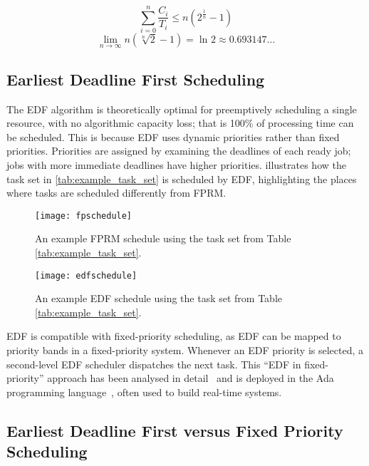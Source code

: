 \begin{equation}
    \label{eq:3}
    \sum\limits_{i=0}^n \dfrac{C_{i}}{T_{i}} \leq n(2^{\frac{1}{n}}-1)
\end{equation}
\begin{equation}
    \label{eq:4}
    \lim_{n \to \infty}n(\sqrt[n]{2}-1) = \ln_{} 2 \approx 0.693147\ldots
\end{equation}

\subsection{Earliest Deadline First Scheduling}
\label{sec:background-edf}

The \gls{EDF} algorithm is theoretically optimal for preemptively scheduling a single resource, with no
algorithmic capacity loss; that is 100\% of processing time can be scheduled. This is because
\gls{EDF} uses dynamic priorities rather than fixed priorities. 
Priorities are assigned by examining the deadlines of each ready job; jobs with more immediate deadlines have higher priorities.
 illustrates how the task set in \cref{tab:example_task_set} is scheduled by
\gls{EDF}, highlighting the places where tasks are scheduled differently from FPRM.

\begin{figure}[t]
	\centering
    \texttt{[image: fpschedule]}
    \caption[An example FPRM schedule.]{An example FPRM schedule using the task set from Table \ref{tab:example_task_set}.}
    \label{f:fp-schedule}
\end{figure}
\begin{figure}[t]
	\centering	
	\texttt{[image: edfschedule]}
    \caption[An example EDF schedule.]{An example EDF schedule using the task set from Table \ref{tab:example_task_set}.}
	\label{f:edf-schedule}
\end{figure}

\gls{EDF} is compatible with fixed-priority scheduling, as \gls{EDF} can be mapped to priority bands
in a fixed-priority system. Whenever an \gls{EDF} priority is selected, a second-level \gls{EDF}
scheduler dispatches the next task. This ``EDF in fixed-priority'' approach has been analysed in
detail~\citep{Harbour_Palencia_03} and is deployed in the Ada programming
language~\citep{Burns_Wellings:crtpa}, often used to build real-time systems.

\subsection{Earliest Deadline First versus Fixed Priority Scheduling}
\label{s:overload}

